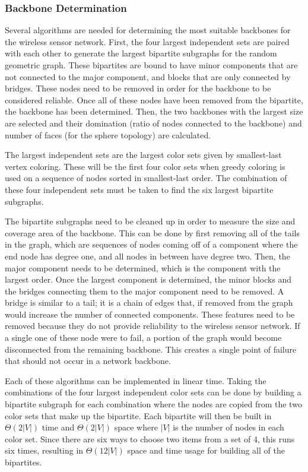 \documentclass{article}
\begin{document}
        \subsubsection{Backbone Determination}
        Several algorithms are needed for determining the most suitable backbones for the wireless sensor network. First, the four largest independent sets are paired with each other to generate the largest bipartite subgraphs for the random geometric graph. These bipartites are bound to have minor components that are not connected to the major component, and blocks that are only connected by bridges. These nodes need to be removed in order for the backbone to be considered reliable. Once all of these nodes have been removed from the bipartite, the backbone has been determined. Then, the two backbones with the largest size are selected and their domination (ratio of nodes connected to the backbone) and number of faces (for the sphere topology) are calculated.
        \par
        The largest independent sets are the largest color sets given by smallest-last vertex coloring. These will be the first four color sets when greedy coloring is used on a sequence of nodes sorted in smallest-last order. The combination of these four independent sets must be taken to find the six largest bipartite subgraphs.
        \par
        The bipartite subgraphs need to be cleaned up in order to measure the size and coverage area of the backbone. This can be done by first removing all of the tails in the graph, which are sequences of nodes coming off of a component where the end node has degree one, and all nodes in between have degree two. Then, the major component needs to be determined, which is the component with the largest order. Once the largest component is determined, the minor blocks and the bridges connecting them to the major component need to be removed. A bridge is similar to a tail; it is a chain of edges that, if removed from the graph would increase the number of connected components. These features need to be removed because they do not provide reliability to the wireless sensor network. If a single one of these node were to fail, a portion of the graph would become disconnected from the remaining backbone. This creates a single point of failure that should not occur in a network backbone.
        \par
        Each of these algorithms can be implemented in linear time. Taking the combinations of the four largest independent color sets can be done by building a bipartite subgraph for each combination where the nodes are copied from the two color sets that make up the bipartite. Each bipartite will then be built in $\Theta(2|V|)$ time and $\Theta(2|V|)$ space where $|V|$ is the number of nodes in each color set. Since there are six ways to choose two items from a set of 4, this runs six times, resulting in $\Theta(12|V|)$ space and time usage for building all of the bipartites.
\end{document}

